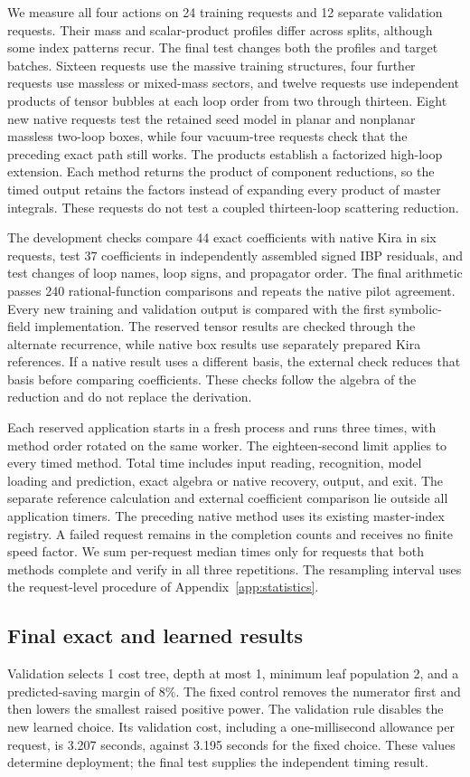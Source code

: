 We measure all four actions on 24 training requests and 12 separate validation requests. Their mass and scalar-product profiles differ across splits, although some index patterns recur. The final test changes both the profiles and target batches. Sixteen requests use the massive training structures, four further requests use massless or mixed-mass sectors, and twelve requests use independent products of tensor bubbles at each loop order from two through thirteen. Eight new native requests test the retained seed model in planar and nonplanar massless two-loop boxes, while four vacuum-tree requests check that the preceding exact path still works. The products establish a factorized high-loop extension. Each method returns the product of component reductions, so the timed output retains the factors instead of expanding every product of master integrals. These requests do not test a coupled thirteen-loop scattering reduction.

The development checks compare 44 exact coefficients with native Kira in six requests, test 37 coefficients in independently assembled signed IBP residuals, and test changes of loop names, loop signs, and propagator order. The final arithmetic passes 240 rational-function comparisons and repeats the native pilot agreement. Every new training and validation output is compared with the first symbolic-field implementation. The reserved tensor results are checked through the alternate recurrence, while native box results use separately prepared Kira references. If a native result uses a different basis, the external check reduces that basis before comparing coefficients. These checks follow the algebra of the reduction and do not replace the derivation.

Each reserved application starts in a fresh process and runs three times, with method order rotated on the same worker. The eighteen-second limit applies to every timed method. Total time includes input reading, recognition, model loading and prediction, exact algebra or native recovery, output, and exit. The separate reference calculation and external coefficient comparison lie outside all application timers. The preceding native method uses its existing master-index registry. A failed request remains in the completion counts and receives no finite speed factor. We sum per-request median times only for requests that both methods complete and verify in all three repetitions. The resampling interval uses the request-level procedure of Appendix~\ref{app:statistics}.

\subsection{Final exact and learned results}
Validation selects 1 cost tree, depth at most 1, minimum leaf population 2, and a predicted-saving margin of 8\%. The fixed control removes the numerator first and then lowers the smallest raised positive power. The validation rule disables the new learned choice. Its validation cost, including a one-millisecond allowance per request, is 3.207 seconds, against 3.195 seconds for the fixed choice. These values determine deployment; the final test supplies the independent timing result.

